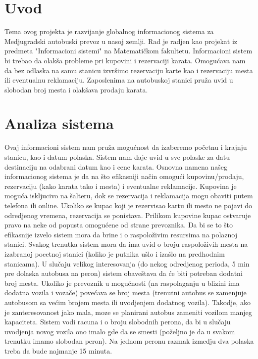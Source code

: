 \section{Uvod}

Tema ovog projekta je razvijanje globalnog informacionog sistema za Medj{}ugradski autobuski prevoz u nasoj zemlji. Rad je radj{}en kao projekat iz predmeta "Informacioni sistemi" na Matemati\v ckom fakultetu. Informacioni sistem bi trebao da olak\v sa probleme pri kupovini i rezervaciji karata. Omogu\'cava nam da bez odlaska na samu stanicu izvr\v simo rezervaciju karte kao i rezervaciju mesta ili eventualnu reklamaciju. Zaposlenima na autobuskoj stanici pru\v za uvid u slobodan broj mesta i olak\v sava prodaju karata.
\section {Analiza sistema}

Ovaj informacioni sistem nam pru\v za mogu\'cnost da izaberemo po\v cetnu i krajnju stanicu, kao i datum polaska. Sistem nam daje uvid u sve polaske za datu destinaciju na odabrani datum kao i cene karata. 
Osnovna namena na\v seg informacionog sistema je da na \v sto efikasniji na\v cin omogu\'ci kupovinu/prodaju, rezervaciju (kako karata tako i mesta) i eventualne reklamacije. Kupovina je mogu\'ca iskljucivo na \v salteru, dok se rezervacija i reklamacija mogu obaviti putem telefona ili online. Ukoliko se kupac koji je rezervisao kartu ili mesto ne pojavi do odredjenog vremena, rezervacija se ponistava. Prilikom kupovine kupac ostvaruje pravo na neke od popusta omogu\'cene od strane prevoznika. Da bi se to \v sto efikasnije izvelo sistem mora da brine i o raspolo\v zivim resursima na polaznoj stanici. Svakog trenutka sistem mora da ima uvid o broju raspolo\v zivih mesta na izabranoj pocetnoj stanici (koliko je putnika u\v slo i iza\v slo na predhodnim stanicama). U slu\v caju velikog interesovanja (do nekog odredjenog perioda, 5 min pre dolaska autobusa na peron) sistem obave\v stava da \'ce biti potreban dodatni broj mesta. Ukoliko je prevoznik u mogu\'cnosti (na raspolaganju u blizini ima dodatna vozila i voza\v ce) pove\'cava se broj mesta (trenutni autobus se zamenjuje autobusom sa ve\'cim brojem mesta ili uvodjenjem dodatnog vozila). Takodje, ako je zanteresovanost jako mala, moze se planirani autobus zameniti vozilom manjeg kapaciteta. Sistem vodi racuna i o broju slobodnih perona, da bi u slu\v caju uvodjenja novog vozila ono imalo gde da se smesti (po\v zeljno je da u svakom trenutku imamo slobodan peron). Na jednom peronu razmak izmedju dva polaska treba da bude najmanje 15 minuta.

